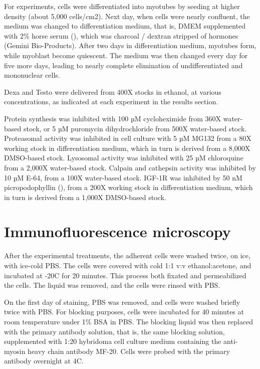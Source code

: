 \documentclass[12pt,english]{report}\usepackage[]{graphicx}\usepackage[]{color}
\begin{document}
For experiments, cells were differentiated into myotubes by seeding
at higher density (about 5,000 cells/cm2). Next day, when cells were
nearly confluent, the medium was changed to differentiation medium,
that is, DMEM supplemented with 2\% horse serum (),
which was charcoal / dextran stripped of hormones (Gemini Bio-Products).
After two days in differentiation medium, myotubes form, while myoblast
become quiescent. The medium was then changed every day for five more
days, leading to nearly complete elimination of undifferentiated and
mononuclear cells.

Dexa and Testo were delivered from 400X stocks in ethanol, at various
concentrations, as indicated at each experiment in the results section.

Protein synthesis was inhibited with 100 µM cycloheximide from 360X
water-based stock, or 5 µM puromycin dihydrochloride from 500X water-based
stock. Proteasomal activity was inhibited in cell culture with 5 µM
MG132 from a 80X working stock in differentiation medium, which in
turn is derived from a 8,000X DMSO-based stock. Lysosomal activity
was inhibited with 25 µM chloroquine from a 2,000X water-based stock.
Calpain and cathepsin activity was inhibited by 10 µM E-64, from a
100X water-based stock. IGF-1R was inhibited by 50 nM picropodophyllin
(), from a 200X working stock
in differentiation medium, which in turn is derived from a 1,000X
DMSO-based stock.


\section{Immunofluorescence microscopy}

After the experimental treatments, the adherent cells were washed
twice, on ice, with ice-cold PBS. The cells were covered with cold
1:1 v:v ethanol:acetone, and incubated at -20C for 20 minutes. This
process both fixated and permeabilized the cells. The liquid was removed,
and the cells were rinsed with PBS.

On the first day of staining, PBS was removed, and cells were washed
briefly twice with PBS. For blocking purposes, cells were incubated
for 40 minutes at room temperature under 1\% BSA in PBS. The blocking
liquid was then replaced with the primary antibody solution, that
is, the same blocking solution, supplemented with 1:20 hybridoma cell
culture medium containing the anti-myosin heavy chain antibody MF-20.
Cells were probed with the primary antibody overnight at 4C.
\end{document}
